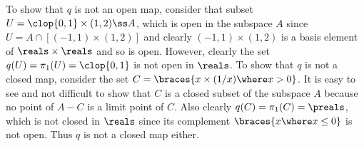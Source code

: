 {{    To show that $q$ is not an open map, consider that subset $U = \clop{0, 1} \times (1,2) \ss A$, which is open in the subspace $A$ since $U = A \cap [(-1,1) \times (1,2)]$ and clearly $(-1,1) \times (1,2)$ is a basis element of $\realss$ and so is open.
    However, clearly the set $q(U) = \pi_1(U) = \clop{0,1}$ is not open in $\reals$.
    To show that $q$ is not a closed map, consider the set $C = \braces{x \times (1/x) \where x > 0}$.
    It is easy to see and not difficult to show that $C$ is a closed subset of the subspace $A$ because no point of $A - C$ is a limit point of $C$.
    Also clearly $q(C) = \pi_1(C) = \preals$, which is not closed in $\reals$ since its complement $\braces{x \where x \leq 0}$ is not open.
    Thus $q$ is not a closed map either.
  }
}
